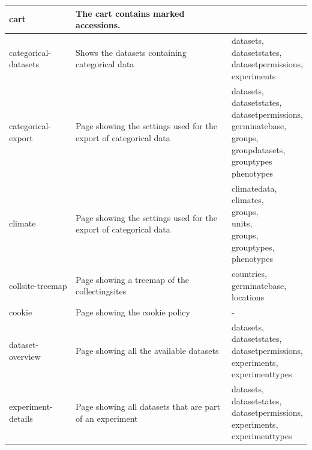 \begin{longtable}{p{}p{}p{}}
	cart                   & The cart contains marked accessions. & \cellwrap{germinatebase} \\ \midrule
	categorical-datasets    & Shows the datasets containing categorical data & \cellwrap{datasets,\\datasetstates,\\datasetpermissions,\\experiments} \\ \midrule
	categorical-export      & Page showing the settings used for the export of categorical data & \cellwrap{datasets,\\datasetstates,\\datasetpermissions,\\germinatebase,\\groups,\\groupdatasets,\\grouptypes\\phenotypes} \\ \midrule
	climate                & Page showing the settings used for the export of categorical data & \cellwrap{climatedata,\\climates,\\groups,\\units,\\groups,\\grouptypes,\\phenotypes} \\ \midrule
	collsite-treemap        & Page showing a treemap of the collectingsites & \cellwrap{countries,\\germinatebase,\\locations} \\ \midrule
	cookie                 & Page showing the cookie policy & - \\ \midrule
	dataset-overview       & Page showing all the available datasets & \cellwrap{datasets,\\datasetstates,\\datasetpermissions,\\experiments,\\experimenttypes} \\ \midrule
	experiment-details     & Page showing all datasets that are part of an experiment & \cellwrap{datasets,\\datasetstates,\\datasetpermissions,\\experiments,\\experimenttypes} \\ \midrule

\end{longtable}

